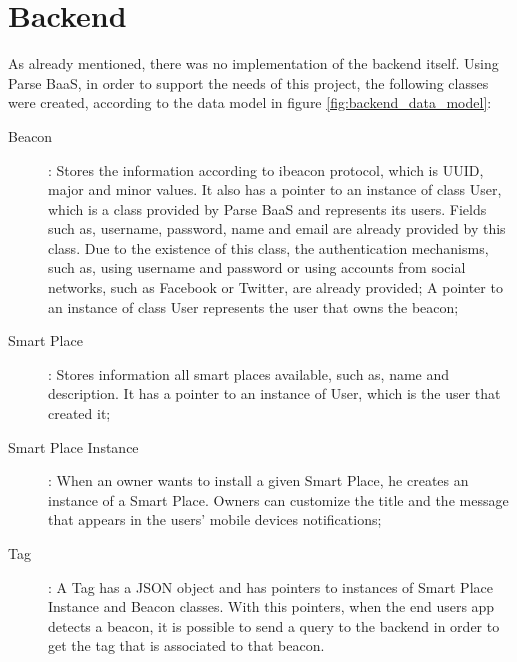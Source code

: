 \section{Backend}
\label{sec:implementation_backend}
As already mentioned, there was no implementation of the backend itself.
Using Parse \gls{BaaS}, in order to support the needs of this project, the following classes were
created, according to the data model in figure \ref{fig:backend_data_model}:
\begin{description}
  \item[Beacon]: Stores the information according to ibeacon protocol,
  which is \gls{UUID}, major and minor values. It also has a pointer
  to an instance of class User, which is a class provided by Parse \gls{BaaS} and represents its users. Fields such as, username, password, name and email are already provided by this class.
  Due to the existence of this class, the authentication mechanisms, such as, using username and password or using accounts from social networks, such as Facebook or Twitter, are already provided;
  A pointer to an instance of class User represents the user that owns the beacon;
  \item[Smart Place]: Stores information all smart places available,
  such as, name and description. It has a pointer to an instance of
  User, which is the user that created it;
  \item[Smart Place Instance]: When an owner wants to install a given
  Smart Place, he creates an instance of a Smart Place. Owners can
  customize the title and the message that appears in the users'
  mobile devices notifications;
  \item[Tag]: A Tag has a \gls{JSON} object and has pointers to instances
  of Smart Place Instance and Beacon classes. With this pointers, when
  the end users app detects a beacon, it is possible to send a query to
  the backend in order to get the tag that is associated to that beacon.
\end{description}

